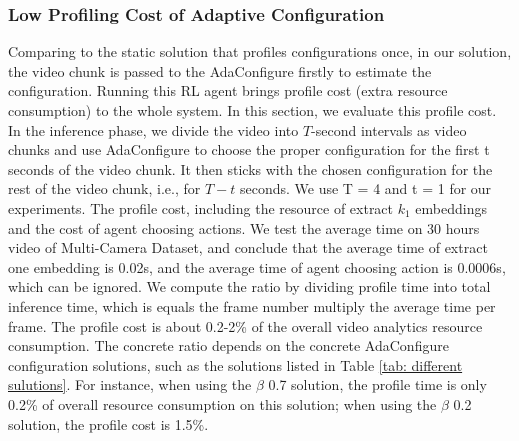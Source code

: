 \subsubsection{Low Profiling Cost of Adaptive Configuration}
\label{subsec: profile cost}
Comparing to the static solution that profiles configurations once, in our solution, the video
chunk is passed to the AdaConfigure firstly to estimate the configuration. Running this RL agent brings profile cost (extra resource consumption) to the whole system. In this section, we evaluate this profile cost. In the inference phase, we divide the video into $T$-second intervals as video chunks and use AdaConfigure to choose the proper configuration for the first t seconds of the video chunk. It then sticks with the chosen configuration for the rest of the video chunk, i.e., for $T-t$ seconds. We use T = 4 and t = 1 for our experiments. The profile cost, including the resource of extract $k_1$ embeddings and the cost of agent choosing actions. We test the average time on 30 hours video of Multi-Camera Dataset, and conclude that the average time of extract one embedding is 0.02s, and the average time of agent choosing action is 0.0006s, which can be ignored. We compute the ratio by dividing profile time into total inference time, which is equals the frame number multiply the average time per frame. The profile cost is about 0.2-2\% of the overall video analytics resource consumption. The concrete ratio depends on the concrete AdaConfigure configuration solutions, such as the solutions listed in Table \ref{tab: different sulutions}. For instance, when using the $\beta$ 0.7 solution, the profile time is only 0.2\% of overall resource consumption on this solution; when using the $\beta$ 0.2 solution, the profile cost is 1.5\%.        

